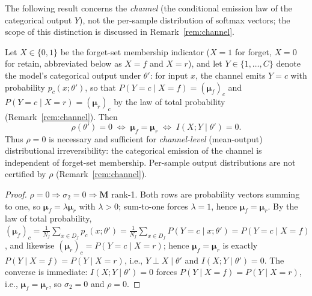 \documentclass[smallextended]{svjour3}       %
\begin{document}
The following result concerns the \emph{channel} (the conditional emission law of the categorical output $Y$), not the per-sample distribution of softmax vectors; the scope of this distinction is discussed in Remark~\ref{rem:channel}.

\begin{theorem}
\label{thm:perfect}
Let $X\in\{0,1\}$ be the forget-set membership indicator ($X{=}1$ for forget, $X{=}0$ for retain, abbreviated below as $X{=}f$ and $X{=}r$), and let $Y\in\{1,\dots,C\}$ denote the model's categorical output under $\theta'$: for input $x$, the channel emits $Y{=}c$ with probability $p_c(x;\theta')$, so that $P(Y{=}c\mid X{=}f)=(\boldsymbol{\mu}_f)_c$ and $P(Y{=}c\mid X{=}r)=(\boldsymbol{\mu}_r)_c$ by the law of total probability (Remark~\ref{rem:channel}). Then
\begin{equation}
\rho(\theta') = 0 \;\Longleftrightarrow\; \boldsymbol{\mu}_f = \boldsymbol{\mu}_r \;\Longleftrightarrow\; I(X; Y \mid \theta') = 0.
\end{equation}
Thus $\rho=0$ is necessary and sufficient for \emph{channel-level} (mean-output) distributional irreversibility: the categorical emission of the channel is independent of forget-set membership. Per-sample output distributions are not certified by $\rho$ (Remark~\ref{rem:channel}).
\end{theorem}

\begin{proof}
$\rho=0 \Rightarrow \sigma_2=0 \Rightarrow \mathbf{M}$ rank-1. Both rows are probability vectors summing to one, so $\boldsymbol{\mu}_f = \lambda\boldsymbol{\mu}_r$ with $\lambda>0$; sum-to-one forces $\lambda=1$, hence $\boldsymbol{\mu}_f=\boldsymbol{\mu}_r$. By the law of total probability, $(\boldsymbol{\mu}_f)_c = \frac{1}{N_f}\sum_{x\in D_f}p_c(x;\theta') = \frac{1}{N_f}\sum_{x\in D_f}P(Y{=}c\mid x;\theta') = P(Y{=}c\mid X{=}f)$, and likewise $(\boldsymbol{\mu}_r)_c = P(Y{=}c\mid X{=}r)$; hence $\boldsymbol{\mu}_f=\boldsymbol{\mu}_r$ is exactly $P(Y\mid X{=}f)=P(Y\mid X{=}r)$, i.e., $Y\perp X\mid\theta'$ and $I(X;Y\mid\theta')=0$. The converse is immediate: $I(X;Y\mid\theta')=0$ forces $P(Y\mid X{=}f)=P(Y\mid X{=}r)$, i.e., $\boldsymbol{\mu}_f=\boldsymbol{\mu}_r$, so $\sigma_2=0$ and $\rho=0$.
\end{proof}
\end{document}
